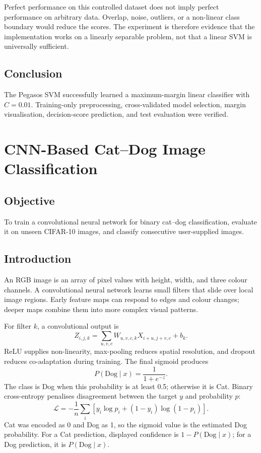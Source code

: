 \documentclass[12pt,a4paper]{report}
\newcommand{\experiment}[2]{
\chapter{#1}}
\begin{document}
Perfect performance on this controlled dataset does not imply perfect performance on arbitrary data. Overlap, noise, outliers, or a non-linear class boundary would reduce the scores. The experiment is therefore evidence that the implementation works on a linearly separable problem, not that a linear SVM is universally sufficient.

\section{Conclusion}
The Pegasos SVM successfully learned a maximum-margin linear classifier with $C=0.01$. Training-only preprocessing, cross-validated model selection, margin visualisation, decision-score prediction, and test evaluation were verified.

\experiment{CNN-Based Cat--Dog Image Classification}{05}

\section{Objective}
To train a convolutional neural network for binary cat--dog classification, evaluate it on unseen CIFAR-10 images, and classify consecutive user-supplied images.

\section{Introduction}
An RGB image is an array of pixel values with height, width, and three colour channels. A convolutional neural network learns small filters that slide over local image regions. Early feature maps can respond to edges and colour changes; deeper maps combine them into more complex visual patterns.

For filter $k$, a convolutional output is
\begin{equation}
Z_{i,j,k}=\sum_{u,v,c}W_{u,v,c,k}X_{i+u,j+v,c}+b_k.
\end{equation}
ReLU supplies non-linearity, max-pooling reduces spatial resolution, and dropout reduces co-adaptation during training. The final sigmoid produces
\begin{equation}
P(\mathrm{Dog}\mid x)=\frac{1}{1+e^{-z}}.
\end{equation}
The class is Dog when this probability is at least 0.5; otherwise it is Cat. Binary cross-entropy penalises disagreement between the target $y$ and probability $p$:
\begin{equation}
\mathcal L=-\frac1n\sum_i\left[y_i\log p_i+(1-y_i)\log(1-p_i)\right].
\end{equation}
Cat was encoded as 0 and Dog as 1, so the sigmoid value is the estimated Dog probability. For a Cat prediction, displayed confidence is $1-P(\mathrm{Dog}\mid x)$; for a Dog prediction, it is $P(\mathrm{Dog}\mid x)$.
\end{document}
